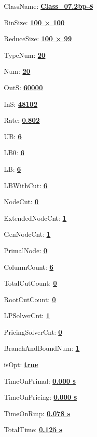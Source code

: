 \documentclass[11pt]{article}
\begin{document}
\pagestyle{empty}


ClassName: \underline{\textbf{Class_07.2bp-8}}
\par
BinSize: \underline{\textbf{100 × 100}}
\par
ReduceSize: \underline{\textbf{100 × 99}}
\par
TypeNum: \underline{\textbf{20}}
\par
Num: \underline{\textbf{20}}
\par
OutS: \underline{\textbf{60000}}
\par
InS: \underline{\textbf{48102}}
\par
Rate: \underline{\textbf{0.802}}
\par
UB: \underline{\textbf{6}}
\par
LB0: \underline{\textbf{6}}
\par
LB: \underline{\textbf{6}}
\par
LBWithCut: \underline{\textbf{6}}
\par
NodeCut: \underline{\textbf{0}}
\par
ExtendedNodeCnt: \underline{\textbf{1}}
\par
GenNodeCnt: \underline{\textbf{1}}
\par
PrimalNode: \underline{\textbf{0}}
\par
ColumnCount: \underline{\textbf{6}}
\par
TotalCutCount: \underline{\textbf{0}}
\par
RootCutCount: \underline{\textbf{0}}
\par
LPSolverCnt: \underline{\textbf{1}}
\par
PricingSolverCnt: \underline{\textbf{0}}
\par
BranchAndBoundNum: \underline{\textbf{1}}
\par
isOpt: \underline{\textbf{true}}
\par
TimeOnPrimal: \underline{\textbf{0.000 s}}
\par
TimeOnPricing: \underline{\textbf{0.000 s}}
\par
TimeOnRmp: \underline{\textbf{0.078 s}}
\par
TotalTime: \underline{\textbf{0.125 s}}
\par
\newpage


\end{document}
